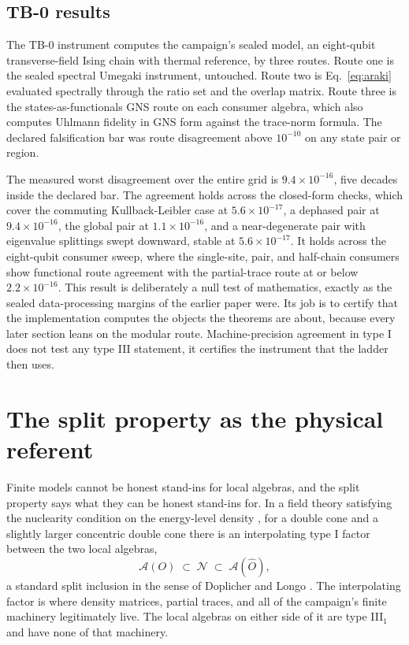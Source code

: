 \documentclass[aps,prd,reprint,nofootinbib,longbibliography]{revtex4-2}
\newcommand{\Ac}{\mathcal{A}}
\newcommand{\Nc}{\mathcal{N}}
\begin{document}
\subsection{TB-0 results}

The TB-0 instrument computes the campaign's sealed model, an eight-qubit
transverse-field Ising chain with thermal reference, by three routes.
Route one is the sealed spectral Umegaki instrument, untouched.  Route
two is Eq.~\eqref{eq:araki} evaluated spectrally through the ratio set
and the overlap matrix.  Route three is the states-as-functionals GNS
route on each consumer algebra, which also computes Uhlmann fidelity in
GNS form against the trace-norm formula.  The declared falsification bar
was route disagreement above $10^{-10}$ on any state pair or region.

The measured worst disagreement over the entire grid is
$9.4\times 10^{-16}$, five decades inside the declared bar.  The agreement
holds across the closed-form checks, which cover the commuting
Kullback-Leibler case at $5.6\times 10^{-17}$, a dephased pair at
$9.4\times 10^{-16}$, the global pair at $1.1\times 10^{-16}$, and a
near-degenerate pair with eigenvalue splittings swept downward, stable at
$5.6\times 10^{-17}$.  It holds across the eight-qubit consumer sweep,
where the single-site, pair, and half-chain consumers show functional
route agreement with the partial-trace route at or below
$2.2\times 10^{-16}$.  This result is deliberately a null test of
mathematics, exactly as the sealed data-processing margins of the earlier
paper were.  Its job is to certify that the implementation computes the
objects the theorems are about, because every later section leans on the
modular route.  Machine-precision agreement in
type I does not test any type III statement, it certifies the instrument
that the ladder then uses.

\section{The split property as the physical referent}
\label{sec:split}

Finite models cannot be honest stand-ins for local algebras, and the
split property says what they can be honest stand-ins for.  In a field
theory satisfying the nuclearity condition on the energy-level density
\cite{BuchholzWichmann1986}, for a double cone and a slightly larger
concentric double cone there is an interpolating type I factor between
the two local algebras,
\begin{equation}
\Ac(O) \;\subset\; \Nc \;\subset\; \Ac(\widehat{O}),
\label{eq:split}
\end{equation}
a standard split inclusion in the sense of Doplicher and Longo
\cite{DoplicherLongo1984}.  The interpolating factor is where density
matrices, partial traces, and all of the campaign's finite machinery
legitimately live.  The local algebras on either side of it are type
III$_{1}$ \cite{Fredenhagen1985} and have none of that machinery.
\end{document}
